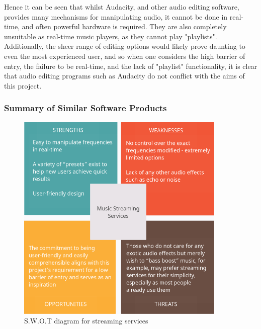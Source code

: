 Hence it can be seen that whilst Audacity, and other audio editing software, provides many mechanisms for manipulating audio, it cannot be done in real-time, and often powerful hardware is required. They are also completely unsuitable as real-time music players, as they cannot play "playlists". Additionally, the sheer range of editing options would likely prove daunting to even the most experienced user, and so when one considers the high barrier of entry, the failure to be real-time, and the lack of "playlist" functionality, it is clear that audio editing programs such as Audacity do not conflict with the aims of this project.

\subsubsection{Summary of Similar Software Products}
\begin{figure}[H]
	\caption{S.W.O.T diagram for streaming services}
	\begin{center}
		\includegraphics[width=10cm]{./SWOT streaming.png}
	\end{center}
\end{figure}
